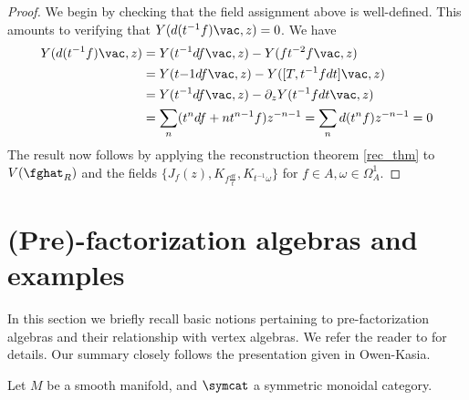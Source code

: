 \documentclass[12pt]{amsart}
\theoremstyle{definition}
\theoremstyle{remark}
\newcommand{\R}{R}
\begin{document}
\begin{proof}
We begin by checking that the field assignment above is well-defined. This amounts to verifying that $Y(d(t^{-1}f)\vac,z ) =0$.  We have 
\begin{align*}
Y(d(t^{-1}f) \vac, z) &= Y(t^{-1} df \vac, z) - Y(f t^{-2} f \vac, z) \\
&= Y(t{-1} df \vac, z) - Y([T, t^{-1}f dt  ] \vac, z) \\
&= Y(t^{-1} df \vac, z) - \partial_z Y( t^{-1} f dt \vac, z) \\
&= \sum_{n} (t^n df + n t^{n-1} f) z^{-n-1} = \sum_{n} d(t^n f) z^{-n-1} = 0
\end{align*}
The result now follows by applying the reconstruction theorem \ref{rec_thm} to $V(\fghat_\R)$ and the fields $\{ J_f (z), K_{f \frac{dt}{t}}, K_{t^{-1} \omega} \}$ for $f \in A, \omega \in \Omega^{1}_A $.
\end{proof}

\section{(Pre)-factorization algebras and examples}

In this section we briefly recall basic notions pertaining to pre-factorization algebras and their relationship with vertex algebras. We refer the reader to \cite{CG} for details. Our summary closely follows the presentation given in \cite{} {\color{red} Owen-Kasia}. 

Let $M$ be a smooth manifold, and $\symcat$ a symmetric monoidal category. 
\end{document}

